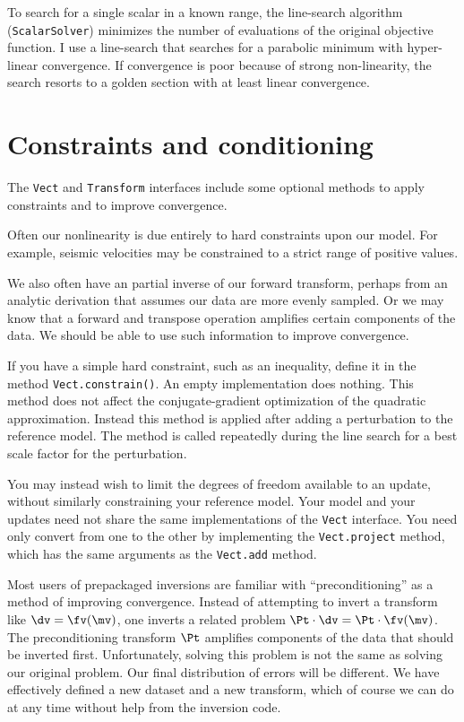 \documentclass[12pt]{article}
\begin{document}
To search for a single scalar in a known
range, the line-search algorithm
(\texttt{ScalarSolver}) minimizes the number
of evaluations of the original objective
function.  I use a line-search that searches
for a parabolic minimum with hyper-linear
convergence.  If convergence is poor because
of strong non-linearity, the search resorts
to a golden section with at least linear
convergence.

\section {Constraints and conditioning}

The \texttt{Vect} and \texttt{Transform}
interfaces include some optional methods to
apply constraints and to improve convergence.

Often our nonlinearity is due entirely to
hard constraints upon our model.  For
example, seismic velocities may be
constrained to a strict range of positive
values.

We also often have an partial inverse of our
forward transform, perhaps from an analytic
derivation that assumes our data are more
evenly sampled.  Or we may know that a
forward and transpose operation amplifies
certain components of the data.  We should be
able to use such information to improve
convergence.

If you have a simple hard constraint, such as
an inequality, define it in the method
\texttt{Vect.constrain()}.  An empty
implementation does nothing.  This method
does not affect the conjugate-gradient
optimization of the quadratic approximation.
Instead this method is applied after adding a
perturbation to the reference model.  The
method is called repeatedly during the line
search for a best scale factor for the
perturbation.

You may instead wish to limit the degrees of
freedom available to an update, without
similarly constraining your reference model.
Your model and your updates need not share
the same implementations of the \texttt{Vect}
interface.  You need only convert from one to
the other by implementing the
\texttt{Vect.project} method, which has the
same arguments as the \texttt{Vect.add}
method.

Most users of prepackaged inversions are
familiar with ``preconditioning'' as a method
of improving convergence.  Instead of
attempting to invert a transform like $\dv =
\fv (\mv)$, one inverts a related problem
$\Pt \cdot \dv = \Pt \cdot \fv (\mv)$.  The
preconditioning transform $\Pt$ amplifies
components of the data that should be
inverted first.  Unfortunately, solving this
problem is not the same as solving our
original problem.  Our final distribution of
errors will be different.  We have
effectively defined a new dataset and a new
transform, which of course we can do at any
time without help from the inversion code.
\end{document}
